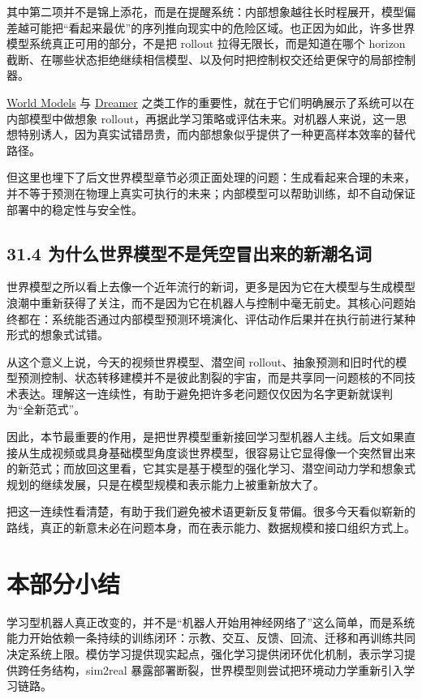 其中第二项并不是锦上添花，而是在提醒系统：内部想象越往长时程展开，模型偏差越可能把“看起来最优”的序列推向现实中的危险区域。也正因为如此，许多世界模型系统真正可用的部分，不是把 rollout 拉得无限长，而是知道在哪个 horizon 截断、在哪些状态拒绝继续相信模型、以及何时把控制权交还给更保守的局部控制器。

\href{https://arxiv.org/abs/1803.10122}{World Models} 与 \href{https://arxiv.org/abs/1912.01603}{Dreamer} 之类工作的重要性，就在于它们明确展示了系统可以在内部模型中做想象 rollout，再据此学习策略或评估未来。对机器人来说，这一思想特别诱人，因为真实试错昂贵，而内部想象似乎提供了一种更高样本效率的替代路径。

但这里也埋下了后文世界模型章节必须正面处理的问题：生成看起来合理的未来，并不等于预测在物理上真实可执行的未来；内部模型可以帮助训练，却不自动保证部署中的稳定性与安全性。

\section*{31.4 为什么世界模型不是凭空冒出来的新潮名词}


世界模型之所以看上去像一个近年流行的新词，更多是因为它在大模型与生成模型浪潮中重新获得了关注，而不是因为它在机器人与控制中毫无前史。其核心问题始终都在：系统能否通过内部模型预测环境演化、评估动作后果并在执行前进行某种形式的想象式试错。

从这个意义上说，今天的视频世界模型、潜空间 rollout、抽象预测和旧时代的模型预测控制、状态转移建模并不是彼此割裂的宇宙，而是共享同一问题核的不同技术表达。理解这一连续性，有助于避免把许多老问题仅仅因为名字更新就误判为“全新范式”。

因此，本节最重要的作用，是把世界模型重新接回学习型机器人主线。后文如果直接从生成视频或具身基础模型角度谈世界模型，很容易让它显得像一个突然冒出来的新范式；而放回这里看，它其实是基于模型的强化学习、潜空间动力学和想象式规划的继续发展，只是在模型规模和表示能力上被重新放大了。

把这一连续性看清楚，有助于我们避免被术语更新反复带偏。很多今天看似崭新的路线，真正的新意未必在问题本身，而在表示能力、数据规模和接口组织方式上。

\chapter*{本部分小结}

学习型机器人真正改变的，并不是“机器人开始用神经网络了”这么简单，而是系统能力开始依赖一条持续的训练闭环：示教、交互、反馈、回流、迁移和再训练共同决定系统上限。模仿学习提供现实起点，强化学习提供闭环优化机制，表示学习提供跨任务结构，sim2real 暴露部署断裂，世界模型则尝试把环境动力学重新引入学习链路。

